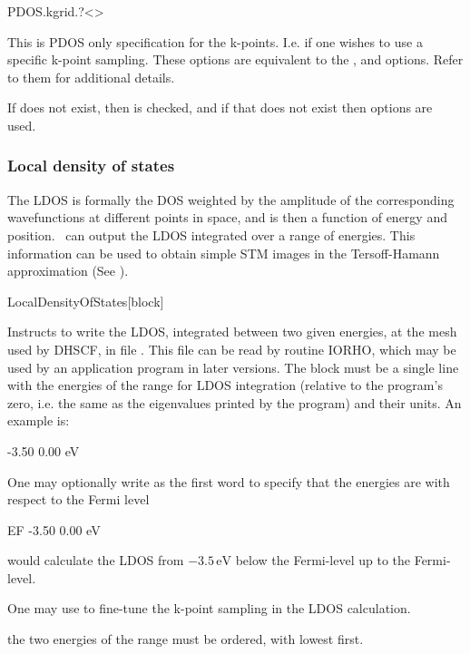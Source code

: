 \begin{fdfentry}{PDOS.kgrid.?}<>

  This is PDOS only specification for the k-points. I.e. if one wishes
  to use a specific k-point sampling. These options are equivalent to
  the ,  and
   options. Refer to them for additional details.

  If  does not exist, then  is
  checked, and if that does not exist then  options are
  used.

\end{fdfentry}


\subsubsection{Local density of states}

The LDOS is formally the DOS weighted by the amplitude of the
corresponding wavefunctions at different points in space, and is then
a function of energy and position. \siesta\ can output the LDOS
integrated over a range of energies. This information can be used to
obtain simple STM images in the Tersoff-Hamann approximation (See
).

\begin{fdfentry}{LocalDensityOfStates}[block]
  
  Instructs to write the LDOS, integrated between two given energies,
  at the mesh used by DHSCF, in file . This file can be
  read by routine IORHO, which may be used by an application program
  in later versions.  The block must be a single line with the
  energies of the range for LDOS integration (relative to the
  program's zero, i.e. the same as the eigenvalues printed by the
  program) and their units.  An example is:
  \begin{fdfexample}
        -3.50  0.00   eV
  \end{fdfexample}

  One may optionally write  as the first word to specify that
  the energies are with respect to the Fermi level
  \begin{fdfexample}
       EF -3.50  0.00   eV
  \end{fdfexample}
  would calculate the LDOS from $-3.5\,\mathrm{eV}$ below the
  Fermi-level up to the Fermi-level.

  One may use  to fine-tune the k-point sampling in
  the LDOS calculation.
  
  \note the two energies of the range must be ordered, with lowest
  first.

\end{fdfentry}

